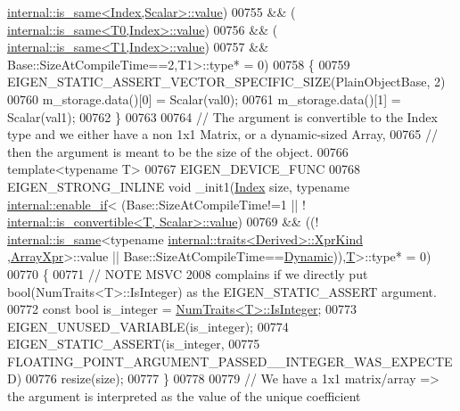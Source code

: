 \begin{DoxyCode}
      \hyperlink{struct_eigen_1_1internal_1_1is__same}{internal::is\_same<Index,Scalar>::value})
00755                                                                   && (
      \hyperlink{struct_eigen_1_1internal_1_1is__same}{internal::is\_same<T0,Index>::value})
00756                                                                   && (
      \hyperlink{struct_eigen_1_1internal_1_1is__same}{internal::is\_same<T1,Index>::value})
00757                                                                   && Base::SizeAtCompileTime==2,T1>::type* 
      = 0)
00758     \{
00759       EIGEN\_STATIC\_ASSERT\_VECTOR\_SPECIFIC\_SIZE(PlainObjectBase, 2)
00760       m\_storage.data()[0] = Scalar(val0);
00761       m\_storage.data()[1] = Scalar(val1);
00762     \}
00763 
00764     \textcolor{comment}{// The argument is convertible to the Index type and we either have a non 1x1 Matrix, or a
       dynamic-sized Array,}
00765     \textcolor{comment}{// then the argument is meant to be the size of the object.}
00766     \textcolor{keyword}{template}<\textcolor{keyword}{typename} T>
00767     EIGEN\_DEVICE\_FUNC
00768     EIGEN\_STRONG\_INLINE \textcolor{keywordtype}{void} \_init1(\hyperlink{namespace_eigen_a62e77e0933482dafde8fe197d9a2cfde}{Index} size, \textcolor{keyword}{typename} 
      \hyperlink{struct_eigen_1_1internal_1_1enable__if}{internal::enable\_if}<    (Base::SizeAtCompileTime!=1 || !
      \hyperlink{struct_eigen_1_1internal_1_1is__convertible}{internal::is\_convertible<T, Scalar>::value})
00769                                                                               && ((!
      \hyperlink{struct_eigen_1_1internal_1_1is__same}{internal::is\_same}<\textcolor{keyword}{typename} \hyperlink{struct_eigen_1_1internal_1_1traits}{internal::traits<Derived>::XprKind}
      ,\hyperlink{struct_eigen_1_1_array_xpr}{ArrayXpr}>::value || Base::SizeAtCompileTime==\hyperlink{namespace_eigen_ad81fa7195215a0ce30017dfac309f0b2}{Dynamic})),\hyperlink{group___sparse_core___module}{T}>::type* = 0)
00770     \{
00771       \textcolor{comment}{// NOTE MSVC 2008 complains if we directly put bool(NumTraits<T>::IsInteger) as the
       EIGEN\_STATIC\_ASSERT argument.}
00772       \textcolor{keyword}{const} \textcolor{keywordtype}{bool} is\_integer = \hyperlink{group___core___module_struct_eigen_1_1_num_traits}{NumTraits<T>::IsInteger};
00773       EIGEN\_UNUSED\_VARIABLE(is\_integer);
00774       EIGEN\_STATIC\_ASSERT(is\_integer,
00775                           FLOATING\_POINT\_ARGUMENT\_PASSED\_\_INTEGER\_WAS\_EXPECTED)
00776       resize(size);
00777     \}
00778     
00779     \textcolor{comment}{// We have a 1x1 matrix/array => the argument is interpreted as the value of the unique coefficient
}
\end{DoxyCode}
